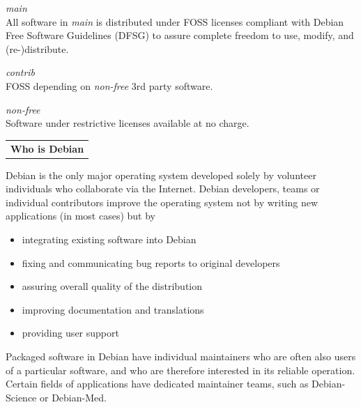 \documentclass[letterpaper,landscape]{report}
\makeatletter
\newenvironment{ndtable}
  {\def\@captype{table}}
  {}
\newcommand{\ndheading}[3]{%
\vspace{0.5em}
\begin{ndtable}%
\rowcolors[\hline]{1}{#2}{} \arrayrulecolor{#3}
\begin{tabularx}{\columnwidth}{>{\centering\arraybackslash}X}\vspace{-.5em}\normalfont\large\bfseries
  #1\vspace{0.05em}\\\end{tabularx}
\end{ndtable}
\vspace{-.5em}
}
\newcommand{\ndsubsection}[1]{\ndheading{#1}{secbgcol}{secfgcol}}
\makeatother
\begin{document}
\begin{multicols}{3}

\begin{description}[nolistsep,leftmargin=1pc,topsep=0em]
\item[Free as in freedom]\hfill\emph{main}\\
  All software in \emph{main} is distributed under FOSS licenses
  compliant with Debian Free Software Guidelines (DFSG) to assure
  complete freedom to use, modify, and (re-)distribute.
\item[Wanna-be free]\hfill\emph{contrib}\\
  FOSS depending on \emph{non-free} 3rd party software.
\item[Somewhat free]\hfill\emph{non-free}\\
  Software under restrictive licenses available at no charge.
\end{description}


\ndsubsection{Who is Debian}

Debian is the only major operating system developed
solely by volunteer individuals who collaborate via the Internet.
Debian developers, teams or individual contributors improve the operating
system not by writing new applications (in most cases) but by
\begin{itemize}[nolistsep,topsep=0em,leftmargin=1pc]
\item integrating existing software into Debian
\item fixing and communicating bug reports to original developers
\item assuring overall quality of the distribution
\item improving documentation and translations
\item providing user support
\end{itemize}

Packaged software in Debian have individual maintainers who are
often also users of a particular software, and who are therefore interested in its
reliable operation. Certain fields of applications have dedicated maintainer
teams, such as Debian-Science or Debian-Med.


\end{multicols}
\end{document}
